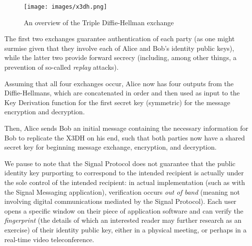 \documentclass[12pt]{article}
\begin{document}
\begin{figure}[h!]
    \centering
    \texttt{[image: images/x3dh.png]}
    \caption{An overview of the Triple Diffie-Hellman exchange\parencite{website:sigdocX3DH}}
    \label{fig:my_label2}
\end{figure}

\newpage 
\par The first two exchanges guarantee authentication of each party (as one might surmise given that they involve each of Alice and Bob's identity public keys), while the latter two provide forward secrecy (including, among other things, a prevention of so-called \textit{replay} attacks). 
\par Assuming that all four exchanges occur, Alice now has four outputs from the Diffie-Hellmans, which are concatenated in order and then used as input to the Key Derivation function for the first secret key (symmetric) for the message encryption and decryption.
\par Then, Alice sends Bob an initial message containing the necessary information for Bob to replicate the X3DH on his end, such that both parties now have a shared secret key for beginning message exchange, encryption, and decryption.
\par We pause to note that the Signal Protocol does not guarantee that the public identity key purporting to correspond to the intended recipient is actually under the sole control of the intended recipient: in actual implementation (such as with the Signal Messaging application), verification occurs \textit{out of band} (meaning not involving digital communications mediated by the Signal Protocol). Each user opens a specific window on their piece of application software and can verify the \textit{fingerprint} (the details of which an interested reader may further research as an exercise) of their identity public key, either in a physical meeting, or perhaps in a real-time video teleconference.
 
\end{document}
